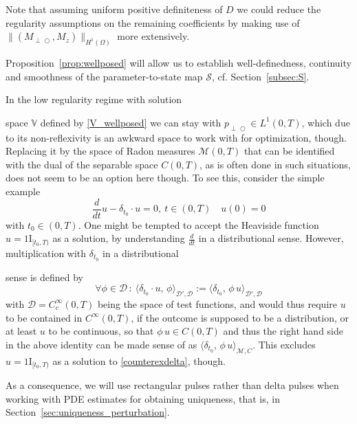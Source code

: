 \documentclass{ws-m3as}
\def\Mpp{M_{\perp\!\!\!\!\!\bigcirc}}
\def\pp{p_{\perp\!\!\!\!\!\bigcirc}}
\newcommand{\revision}[1]{{ #1}}
\newcommand{\Margin}[1]{}
\begin{document}
Note that assuming uniform positive definiteness of $D$ we could reduce the regularity assumptions on the remaining coefficients by making use of $\|(\Mpp,M_z)\|_{H^1(\Omega)}$ more extensively.

Proposition~\ref{prop:wellposed} will allow us to establish well-definedness, continuity and smoothness of the parameter-to-state map $\mathcal{S}$, cf. Section~\ref{subsec:S}.

\begin{remark}\label{rem:pdelta}
In the low regularity regime with 
\revision{solution}
\Margin{R1 3.} 
space $\mathbb{V}$ defined by \eqref{V_wellposed} we can stay with $\pp\in L^1(0,T)$, which due to its non-reflexivity is an awkward space to work with for optimization, though. Replacing it by the space of Radon measures $\mathcal{M}(0,T)$ that can be identified with the dual of the separable space $C(0,T)$, as is often done in such situations, does not seem to be an option here though. To see this, consider the simple example 
\begin{equation}\label{counterexdelta}
\frac{d}{dt} u - \delta_{t_0}\cdot u =0, \ t\in(0,T)\quad u(0)=0
\end{equation}
with $t_0\in(0,T)$. One might be tempted to accept the Heaviside function $u=1\!\mathrm{I}_{[t_0,T)}$
as a solution, by understanding $\frac{d}{dt}$ in a distributional sense. However, multiplication with $\delta_{t_0}$ in a 
\revision{distributional} 
\Margin{R1 4.}
sense is defined by 
\[
\forall \phi\in\mathcal{D}\,: \ \langle \delta_{t_0}\cdot u, \, \phi\rangle_{\mathcal{D}',\mathcal{D}}
:=\langle \delta_{t_0}, \, \phi\,u\rangle_{\mathcal{D}',\mathcal{D}}
\]
with $\mathcal{D}=C_c^\infty(0,T)$ being the space of test functions, and would thus require $u$ to be contained in $C^\infty(0,T)$, if the outcome is supposed to be a distribution, or at least $u$ to be continuous, so that $\phi\,u\in C(0,T)$ and thus the right hand side in the above identity can be made sense of as $\langle \delta_{t_0}, \, \phi\,u\rangle_{\mathcal{M},C}$. This excludes $u=1\!\mathrm{I}_{[t_0,T)}$ as a solution to \eqref{counterexdelta}, though.

As a consequence, we will use rectangular pulses rather than delta pulses when working with PDE estimates for obtaining uniqueness, that is, in Section~\ref{sec:uniqueness_perturbation}.
\end{remark}
\end{document}
